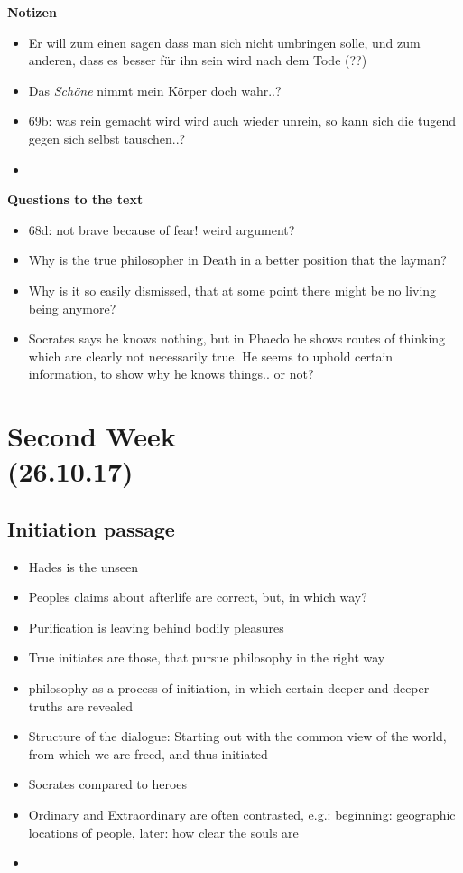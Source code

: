 \documentclass[emulatestandardclasses]{scrartcl}
\begin{document}
\textbf{Notizen}

\begin{itemize}
  \item Er will zum einen sagen dass man sich nicht umbringen solle, und zum anderen, dass es besser für ihn sein wird nach dem Tode (??)
  \item Das \emph{Schöne} nimmt mein Körper doch wahr..?
  \item 69b: was rein gemacht wird wird auch wieder unrein, so kann sich die tugend gegen sich selbst tauschen..?
  \item 
\end{itemize}

\textbf{Questions to the text}

\begin{itemize}
  \item 68d: not brave because of fear! weird argument?
  \item Why is the true philosopher in Death in a better position that the layman?
  \item Why is it so easily dismissed, that at some point there might be no living being anymore?
  \item Socrates says he knows nothing, but in Phaedo he shows routes of thinking which are clearly not necessarily true. He seems to uphold certain information, to show why he knows things.. or not?
\end{itemize}

\section{Second Week \\(26.10.17)}

\subsection{Initiation passage}

\begin{itemize}
  \item Hades is the unseen
  \item Peoples claims about afterlife are correct, but, in which way?
  \item Purification is leaving behind bodily pleasures
  \item True initiates are those, that pursue philosophy in the right way
  \item philosophy as a process of initiation, in which certain deeper and deeper truths are revealed
  \item Structure of the dialogue: Starting out with the common view of the world, from which we are freed, and thus initiated
  \item Socrates compared to heroes
  \item Ordinary and Extraordinary are often contrasted, e.g.: beginning: geographic locations of people, later: how clear the souls are 
  \item 
\end{itemize}
\end{document}
